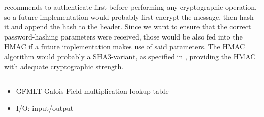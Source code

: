 \cite{moxie} recommends to authenticate first before performing any
cryptographic operation, so a future implementation would probably first
encrypt the message, then hash it and append the hash to the header.
Since we want to ensure that the correct password-hashing parameters
were received, those would be also fed into the HMAC if a future
implementation makes use of said parameters. The HMAC algorithm would
probably a SHA3-variant, as specified in \cite{fips202}, providing the HMAC
with adequate cryptographic strength.

\begin{center}\rule{0.5\linewidth}{0.5pt}\end{center}

\begin{itemize}

\item
  GFMLT Galois Field multiplication lookup table
\item
  I/O: input/output
\end{itemize}
